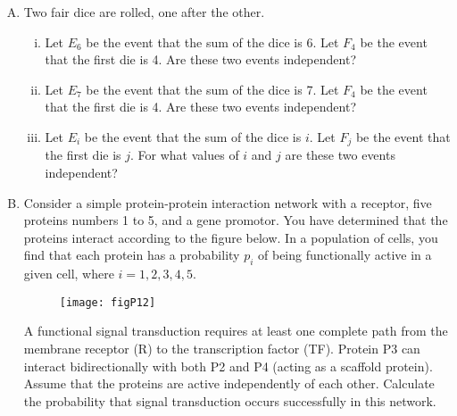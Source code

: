 \documentclass[12pt,letterpaper]{article}
\begin{document}
\begin{enumerate}[A.]

\item Two fair dice are rolled, one after the other.
\begin{enumerate}[i.]
\item Let $E_{6}$ be the event that the sum of the dice is 6. Let $F_4$ be the event that the first die is 4. Are these two events independent?
\item Let $E_{7}$ be the event that the sum of the dice is 7. Let $F_4$ be the event that the first die is 4. Are these two events independent?
\item Let $E_i$ be the event that the sum of the dice is $i$. Let $F_j$ be the event that the first die is $j$. For what values of $i$ and $j$ are these two events independent?
\end{enumerate}

\item Consider a simple protein-protein interaction network with a receptor, five proteins numbers 1 to 5, and a gene promotor.
You have determined that the proteins interact according to the figure below. 
In a population of cells, you find that each protein has a probability $p_i$ of being functionally active in a given cell, where $i=1,2,3,4,5$. 
\begin{figure}[h!]
\centering
\centering\texttt{[image: figP12]}
\end{figure}
A functional signal transduction requires at least one complete path from the membrane receptor (R) to the transcription factor (TF). 
Protein P3 can interact bidirectionally with both P2 and P4 (acting as a scaffold protein). 
Assume that the proteins are active independently of each other.
Calculate the probability that signal transduction occurs successfully in this network.

\end{enumerate}
\end{document}
